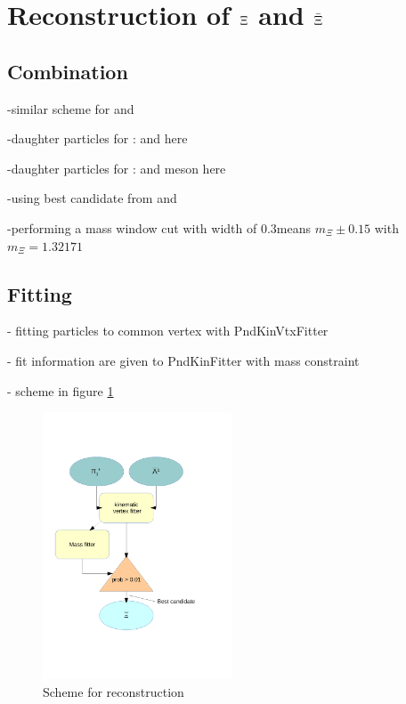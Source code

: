 		
		
		
	
\section{Reconstruction of $\boldmath{\Xi}$ and $\boldmath{\bar{\Xi}}$}
	\subsection{Combination}
	
		-similar scheme for \lam and \alam
		
		-daughter particles for \anticascade: \alam and \piplus here \piplusone
		
		-daughter particles for \cascade:  \lam and \piminus meson here \piminusone
		
		-using best candidate from \lam and \alam
		
		-performing a mass window cut with width of $0.3$\massunit means $m_{\Xi} \pm 0.15$ \massunit with $m_{\Xi} = 1.32171$ \massunit \cite{PDG}
		 
		
		
	\subsection{Fitting}
	
		- fitting particles to common vertex with PndKinVtxFitter
		
		- fit information are given to PndKinFitter with mass constraint
		
		- scheme in figure \ref{fig:anticascade_scheme}
		
		\begin{figure}
			\centering
				\includegraphics[width=0.50\textwidth]{./plots/combineAntiCascade.pdf}
			\caption{Scheme for \anticascade reconstruction}
			\label{fig:anticascade_scheme}
		\end{figure}
		
